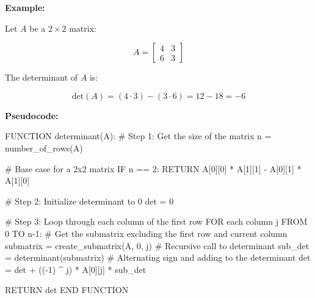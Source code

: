 \documentclass[
  letterpaper,
  DIV=11,
  numbers=noendperiod]{scrreprt}
\newenvironment{Shaded}{\begin{snugshade}}{\end{snugshade}}
\newcommand{\CommentTok}[1]{\textcolor[rgb]{0.37,0.37,0.37}{#1}}
\newcommand{\DecValTok}[1]{\textcolor[rgb]{0.68,0.00,0.00}{#1}}
\newcommand{\NormalTok}[1]{\textcolor[rgb]{0.00,0.23,0.31}{#1}}
\newcommand{\OperatorTok}[1]{\textcolor[rgb]{0.37,0.37,0.37}{#1}}
\theoremstyle{plain}
\theoremstyle{definition}
\theoremstyle{remark}
\begin{document}
\textbf{Example:}

Let \(A\) be a \(2 \times 2\) matrix:

\[A = \begin{bmatrix} 4 & 3 \\ 6 & 3 \end{bmatrix}\]

The determinant of \(A\) is:

\[\text{det}(A) = (4 \cdot 3) - (3 \cdot 6) = 12 - 18 = -6\]

\textbf{Pseudocode:}

\begin{Shaded}
\begin{Highlighting}[]
\NormalTok{FUNCTION determinant(A):}
    \CommentTok{\# Step 1: Get the size of the matrix}
\NormalTok{    n }\OperatorTok{=}\NormalTok{ number\_of\_rows(A)}
    
    \CommentTok{\# Base case for a 2x2 matrix}
\NormalTok{    IF n }\OperatorTok{==} \DecValTok{2}\NormalTok{:}
\NormalTok{        RETURN A[}\DecValTok{0}\NormalTok{][}\DecValTok{0}\NormalTok{] }\OperatorTok{*}\NormalTok{ A[}\DecValTok{1}\NormalTok{][}\DecValTok{1}\NormalTok{] }\OperatorTok{{-}}\NormalTok{ A[}\DecValTok{0}\NormalTok{][}\DecValTok{1}\NormalTok{] }\OperatorTok{*}\NormalTok{ A[}\DecValTok{1}\NormalTok{][}\DecValTok{0}\NormalTok{]}
    
    \CommentTok{\# Step 2: Initialize determinant to 0}
\NormalTok{    det }\OperatorTok{=} \DecValTok{0}
    
    \CommentTok{\# Step 3: Loop through each column of the first row}
\NormalTok{    FOR each column j FROM }\DecValTok{0}\NormalTok{ TO n}\OperatorTok{{-}}\DecValTok{1}\NormalTok{:}
        \CommentTok{\# Get the submatrix excluding the first row and current column}
\NormalTok{        submatrix }\OperatorTok{=}\NormalTok{ create\_submatrix(A, }\DecValTok{0}\NormalTok{, j)}
        \CommentTok{\# Recursive call to determinant}
\NormalTok{        sub\_det }\OperatorTok{=}\NormalTok{ determinant(submatrix)}
        \CommentTok{\# Alternating sign and adding to the determinant}
\NormalTok{        det }\OperatorTok{=}\NormalTok{ det }\OperatorTok{+}\NormalTok{ ((}\OperatorTok{{-}}\DecValTok{1}\NormalTok{) }\OperatorTok{\^{}}\NormalTok{ j) }\OperatorTok{*}\NormalTok{ A[}\DecValTok{0}\NormalTok{][j] }\OperatorTok{*}\NormalTok{ sub\_det}
    
\NormalTok{    RETURN det}
\NormalTok{END FUNCTION}


\end{Highlighting}
\end{Shaded}
\end{document}

